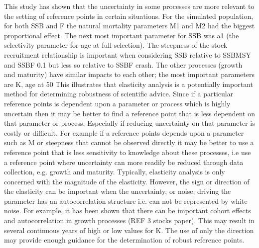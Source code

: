 \documentclass{pnastwo}
\begin{document}
\begin{article}
This study has shown that the uncertainty in some processes are more relevant to the setting of reference points in certain situations. For the simulated population, for both SSB and F the natural mortality parameters M1 and M2 had the biggest proportional eﬀect. The next most important parameter for SSB was a1 (the selectivity parameter for age at full selection). The steepness of the stock recruitment relationship is important when considering SSB relative to SSBMSY and SSBF 0.1 but less so relative to SSBF crash. The other processes (growth and maturity) have similar impacts to each other; the most important parameters are K, age at 50%
This illustrates that elasticity analysis is a potentially important method for determining robustness of scientific advice. Since if a particular reference points is dependent upon a parameter or process which is highly uncertain then it may be better to find a reference point that is less dependent on that parameter or process. Especially if reducing uncertainty on that parameter is costly or diﬃcult. For example if a reference points depends upon a parameter such as M or steepness that cannot be observed directly it may be better to use a reference point that is less sensitivity to knowledge about these processes, i.e use a reference point where uncertainty can more readily be reduced through data collection, e.g. growth and maturity. 
Typically, elasticity analysis is only concerned with the magnitude of the elasticity. However, the sign or direction of the elasticity can be important when the uncertainty, or noise, driving the parameter has an autocorrelation structure i.e. can not be represented by white noise. For example, it has been shown that there can be important cohort eﬀects and autocorrelation in growth processes (REF 3 stocks paper). This may result in several continuous years of high or low values for K. The use of only the direction may provide enough guidance for the determination of robust reference points.

\end{article}
\end{document}
